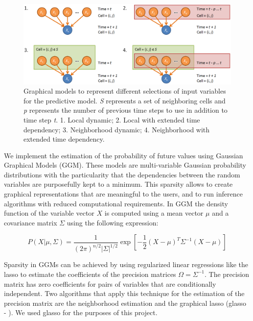 \documentclass{article}
\begin{document}
\begin{center}
\begin{figure}
\includegraphics[width=0.9\columnwidth]{images/plate_models.png}
\caption{Graphical models to represent different
selections of input variables for the predictive model. \textit{S} represents
a set of neighboring cells and \textit{p} represents the number of previous
time steps to use in addition to time step \textit{t}. 1.
Local dynamic; 2. Local with extended time dependency; 3.
Neighborhood dynamic; 4. Neighborhood with extended time
dependency.}\label{fig:plate_models}
\end{figure}
\end{center}

We implement the estimation of the probability of future values using
Gaussian Graphical Models (GGM). These models are multi-variable Gaussian
probability distributions with the particularity that the dependencies between
the random variables are purposefully kept to a minimum. This sparsity allows
to create graphical representations that are meaningful to the users, and to
run inference algorithms with reduced computational requirements. In GGM the
density function of the variable vector $X$ is computed using a mean vector
$\mu$ and a covariance matrix $\Sigma$ using the following expression:

\begin{equation}
\label{eq:gaussian}
P(X|\mu,\Sigma) =
\frac{1}{(2\pi)^{n/2}\vert\Sigma\vert^{1/2}}\exp[-\frac{1}{2}(X - \mu)^T\Sigma^{-1}(X - \mu)]
\end{equation}

Sparsity in GGMs can be achieved by using regularized linear regressions like
the lasso \cite{tibshirani1996} to estimate the coefficients of the precision
matrices $\Omega=\Sigma^{-1}$. The precision matrix has zero coefficients for
pairs of variables that are conditionally independent. Two algorithms that apply
this technique for the estimation of the precision matrix are the
neighborhood estimation \cite{meinshausen2006} and the graphical lasso
(glasso - \cite{Friedman2008}). We used glasso for the purposes of this
project.
\end{document}

